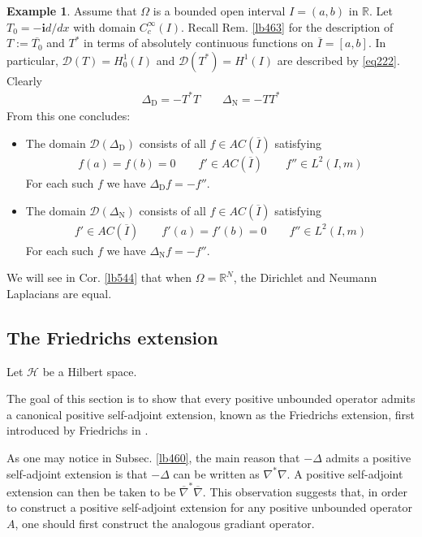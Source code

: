 \documentclass[12pt,b5paper,notitlepage]{article}
\theoremstyle{definition}
\newtheorem{eg}[df]{Example}
\theoremstyle{plain}
\newcommand{\ovl}{\overline}
\newcommand{\Dom}{\mathscr{D}}
\newcommand{\im}{\mathbf{i}}
\newcommand{\Rbb}{\mathbb R}
\newcommand{\MH}{\mathcal H}
\newcommand{\DD}{\Delta_{\mathrm D}}
\newcommand{\DN}{\Delta_{\mathrm N}}
\numberwithin{equation}{section}
\begin{document}
\begin{eg}
Assume that $\Omega$ is a bounded open interval $I=(a,b)$ in $\Rbb$. Let $T_0=-\im d/dx$ with domain $C_c^\infty(I)$. Recall Rem. \ref{lb463} for the description of $T:=\ovl {T_0}$ and $T^*$ in terms of absolutely continuous functions on $\ovl I=[a,b]$. In particular, $\Dom(T)=H_0^1(I)$ and $\Dom(T^*)=H^1(I)$ are described by \eqref{eq222}. Clearly
\begin{align*}
\DD=-T^*T\qquad \DN=-TT^*
\end{align*}
From this one concludes:
\begin{itemize}
\item The domain $\Dom(\DD)$ consists of all $f\in AC(\ovl I)$ satisfying
\begin{align*}
f(a)=f(b)=0\qquad f'\in AC(\ovl I)\qquad f''\in L^2(I,m)
\end{align*}
For each such $f$ we have $\DD f=-f''$.
\item The domain $\Dom(\DN)$ consists of all $f\in AC(\ovl I)$ satisfying
\begin{align*}
f'\in AC(\ovl I)\qquad f'(a)=f'(b)=0\qquad f''\in L^2(I,m)
\end{align*}
For each such $f$ we have $\DN f=-f''$.
\end{itemize}
\end{eg}


We will see in Cor. \ref{lb544} that when $\Omega=\Rbb^N$, the Dirichlet and Neumann Laplacians are equal.





\subsection{The Friedrichs extension}\label{lb465}


Let $\MH$ be a Hilbert space.

The goal of this section is to show that every positive unbounded operator admits a canonical positive self-adjoint extension, known as the Friedrichs extension, first introduced by Friedrichs in \cite{Fri34a}. 

As one may notice in Subsec. \ref{lb460}, the main reason that $-\Delta$ admits a positive self-adjoint extension is that $-\Delta$ can be written as $\nabla^*\nabla$. A positive self-adjoint extension can then be taken to be $\ovl\nabla^*\ovl\nabla$. This observation suggests that, in order to construct a positive self-adjoint extension for any positive unbounded operator $A$, one should first construct the analogous gradiant operator.
\end{document}
